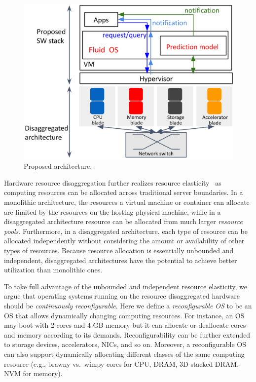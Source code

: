 \begin{figure}[]
     \centering
     \includegraphics[scale=0.15]{images/architecture.png}
     \caption{Proposed architecture.}
     \label{fig:archi}
\end{figure}


Hardware resource disaggregation further realizes resource
elasticity~\cite{herbst2013elasticity} as computing resources can
be allocated across traditional server boundaries.  In a monolithic
architecture, the resources a virtual machine or container can
allocate are limited by the resources on the hosting physical
machine, while in a disaggregated architecture resource can be
allocated from much larger \emph{resource pools}.  Furthermore, in
a disaggregated architecture, each type of resource can be allocated
independently without considering the amount or availability of
other types of resources.  Because resource allocation is essentially
unbounded and independent, disaggregated architectures have the
potential to achieve better utilization than monolithic ones.

To take full advantage of the unbounded and independent resource
elasticity, we argue that operating systems running on the resource
disaggregated hardware should be \emph{continuously reconfigurable}.
Here we define a \emph{reconfigurable OS} to be an OS that allows
dynamically changing computing resources. For instance, an OS may
boot with 2 cores and 4 GB memory but it can allocate or deallocate
cores and memory according to its demands. Reconfigurability can
be further extended to storage devices, accelerators, NICs, and so
on.  Moreover, a reconfigurable OS can also support dynamically
allocating different classes of the same computing resource (e.g.,
brawny vs.~wimpy cores for CPU, DRAM, 3D-stacked DRAM, NVM for
memory).

